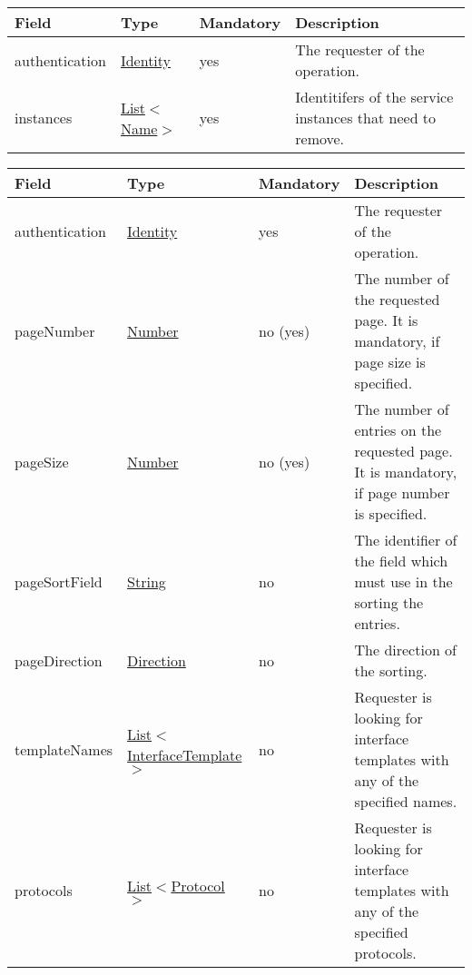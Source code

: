 \documentclass[a4paper]{arrowhead}
\newcommand{\pref}[1]{{\textcolor{ArrowheadGrey}{\hyperref[sec:model:primitives:#1]{#1}}}}
\begin{document}
\label{sec:model:ServiceRemoveRequest}

\begin{table}[ht!]
\begin{tabularx}{\textwidth}{| p{4.1cm} | p{4.8cm} | p{2cm} | X |} \hline
\rowcolor{gray!33} Field & Type & Mandatory & Description \\ \hline
authentication & \hyperref[sec:model:Identity]{Identity} & yes & The requester of the operation. \\ \hline
instances &  \pref{List}$<$\pref{Name}$>$ & yes & Identitifers of the service instances that need to remove. \\ \hline
\end{tabularx}
\end{table}

\label{sec:model:InterfaceTemplateQueryRequest}

\begin{table}[ht!]
\begin{tabularx}{\textwidth}{| p{5.3cm} | p{4.8cm} | p{2cm} | X |} \hline
\rowcolor{gray!33} Field & Type & Mandatory & Description \\ \hline
authentication & \hyperref[sec:model:Identity]{Identity} & yes & The requester of the ope\-ration. \\ \hline
pageNumber & \pref{Number} & no (yes) & The number of the requested page. It is mandatory, if page size is specified. \\ \hline
pageSize & \pref{Number} & no (yes) & The number of entries on the requested page. It is mandatory, if page number is specified. \\ \hline
pageSortField & \pref{String} & no & The identifier of the field which must use in the sorting the entries. \\ \hline
pageDirection & \pref{Direction} & no & The direction of the sorting. \\ \hline
templateNames &  \pref{List}$<$\pref{InterfaceTemplate}$>$ & no & Requester is looking for interface templates with any of the spe\-cified names. \\ \hline
protocols &  \pref{List}$<$\pref{Protocol}$>$ & no & Requester is looking for interface templates with any of the specified protocols. \\ \hline
\end{tabularx}
\end{table}

\label{sec:model:InterfaceTemplateListResponse}
\end{document}
